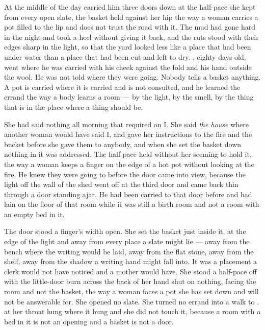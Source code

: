 
At the middle of the day  carried him three doors down  at the half-pace she kept from every open slate, the basket held against her hip the way a woman carries a pot filled to the lip and does not trust the road with it. The mud had gone hard in the night and took a heel without giving it back, and the ruts stood with their edges sharp in the light, so that the yard looked less like a place that had been under water than a place that had been cut and left to dry. , eighty days old, went where he was carried with his cheek against the fold and his hand outside the wool. He was not told where they were going. Nobody tells a basket anything. A pot is carried where it is carried and is not consulted, and he learned the errand the way a body learns a room --- by the light, by the smell, by the thing that is in the place where a thing should be.

She had said nothing all morning that required an I. She said \emph{the house} where another woman would have said I, and gave her instructions to the fire and the bucket before she gave them to anybody, and when she set the basket down nothing in it was addressed. The half-pace held without her seeming to hold it, the way a woman keeps a finger on the edge of a hot pot without looking at the fire. He knew they were going to  before the door came into view, because the light off the wall of the shed went off at the third door and came back thin through a door standing ajar. He had been carried to that door before and had lain on the floor of that room while it was still a birth room and not a room with an empty bed in it.

The door stood a finger's width open. She set the basket just inside it, at the edge of the light and away from every place a slate might lie --- away from the bench where the writing would be laid, away from the flat stone, away from the shelf, away from the shadow a writing hand might fall into. It was a placement a clerk would not have noticed and a mother would have. She stood a half-pace off with the little-door burn across the back of her hand shut on nothing, facing the room and not the basket, the way a woman faces a pot she has set down and will not be answerable for. She opened no slate. She turned no errand into a walk to .  at her throat hung where it hung and she did not touch it, because a room with a bed in it is not an opening and a basket is not a door.

